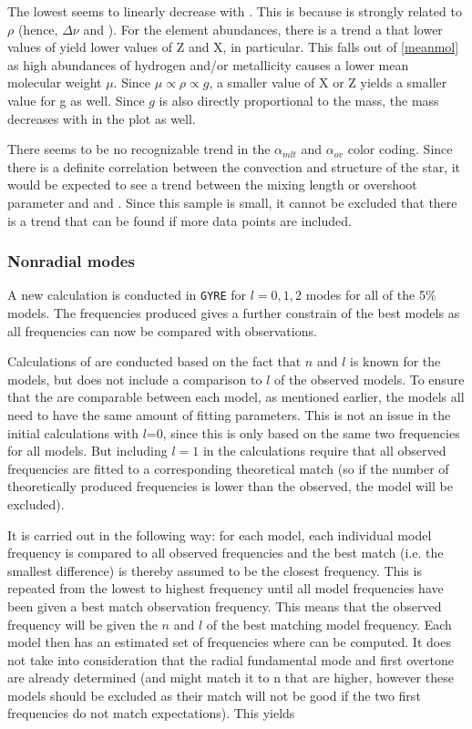 The lowest \chis seems to linearly decrease with \teff. This is because \logg is strongly related to $\rho$ (hence, $\Delta \nu$ and \teff).  For the element abundances, there is a trend a that lower values of \logg yield lower values of Z and X, in particular. This falls out of \eqref{meanmol} as high abundances of hydrogen and/or metallicity causes a lower mean molecular weight $\mu$. Since $\mu \propto \rho \propto g$, a smaller value of X or Z yields a smaller value for g as well. Since $g$ is also directly proportional to the mass, the mass decreases with \logg in the plot as well. 

There seems to be no recognizable trend in the $\alpha_{mlt}$ and $\alpha_{ov}$ color coding. Since there is a definite correlation between the convection and structure of the star, it would be expected to see a trend between the mixing length or overshoot parameter and \logg and \teff. Since this sample is small, it cannot be excluded that there is a trend that can be found if more data points are included.   


\subsubsection{Nonradial modes}
\label{highermodes}
A new calculation is conducted in \texttt{GYRE} for $l=0,1,2$ modes for all of the 5\% models. The frequencies produced gives a further constrain of the best models as all frequencies can now be compared with observations. 

Calculations of \chis are conducted based on the fact that $n$ and $l$ is known for the models, but does not include a comparison to $l$ of the observed models. To ensure that the \chis are comparable between each model, as mentioned earlier, the models all need to have the same amount of fitting parameters. This is not an issue in the initial \chis calculations with $l$=0, since this \chis is only based on the same two frequencies for all models. But including $l=1$ in the calculations require that all observed frequencies are fitted to a corresponding theoretical match (so if the number of theoretically produced frequencies is lower than the observed, the model will be excluded).

It is carried out in the following way: for each model, each individual model frequency is compared to all observed frequencies and the best match (i.e. the smallest difference) is thereby assumed to be the closest frequency. This is repeated from the lowest to highest frequency until all model frequencies have been given a best match observation frequency. This means that the observed frequency will be given the $n$ and $l$ of the best matching model frequency. Each model then has an estimated set of frequencies where \chis can be computed. It does not take into consideration that the radial fundamental mode and first overtone are already determined (and might match it to n that are higher, however these models should be excluded as their match will not be good if the two first frequencies do not match expectations). This yields


